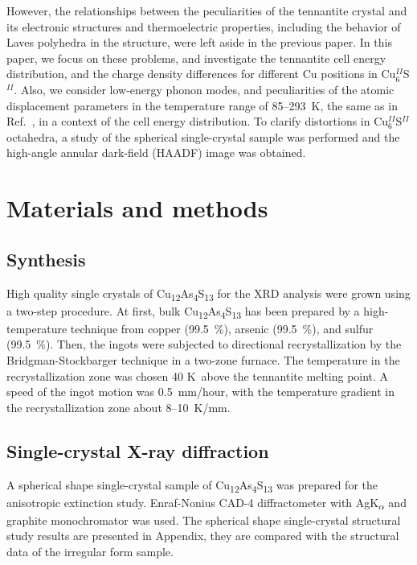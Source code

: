 \documentclass[preprint,review,12pt]{elsarticle}
\begin{document}
However, the relationships between the peculiarities of the tennantite crystal and its electronic structures and thermoelectric properties, including the behavior of Laves polyhedra in the structure, were left aside in the previous paper\cite{yaroslavzev2019}.
In this paper, we focus on these problems, and  investigate the tennantite cell energy distribution, and the charge density differences for different Cu positions in Cu$_{6}^{II}$S$^{II}$.
Also, we consider low-energy phonon modes, and peculiarities of the atomic displacement parameters in the temperature range of 85--293~K, the same as in Ref.~\cite{Dudka2019}, in a context of the cell energy distribution.
To clarify distortions in Cu$_{6}^{II}$S$^{II}$ octahedra, a study of the spherical single-crystal sample was performed and  the high-angle annular dark-field (HAADF) image was obtained.


\section{Materials and methods}\label{sec:level1}
\subsection{Synthesis}\label{sec:level2}

High quality single crystals of Cu\textsubscript{12}As\textsubscript{4}S\textsubscript{13} for the XRD analysis were grown using a two-step procedure. At first, bulk Cu\textsubscript{12}As\textsubscript{4}S\textsubscript{13} has been prepared by a high-temperature technique from copper (99.5~\%), arsenic (99.5~\%), and sulfur (99.5~\%).
Then, the ingots were subjected to directional recrystallization by the Bridgman-Stockbarger technique in a two-zone furnace.
The temperature in the recrystallization zone was chosen 40 K~above the tennantite melting point. A speed of the  ingot motion was 0.5~mm/hour, with the temperature gradient in the recrystallization zone about 8--10~K/mm.

\subsection{Single-crystal X-ray diffraction}\label{sec:level2}
A spherical shape single-crystal sample of Cu\textsubscript{12}As\textsubscript{4}S\textsubscript{13}  was prepared for the anisotropic extinction study\cite{Becker1975}.
Enraf-Nonius CAD-4 diffractometer with AgK\textsubscript{$\alpha$} and graphite monochromator was used. 
The spherical shape single-crystal structural study results are presented in Appendix, they are compared with the structural data of the irregular form sample\cite{yaroslavzev2019}.
\end{document}
